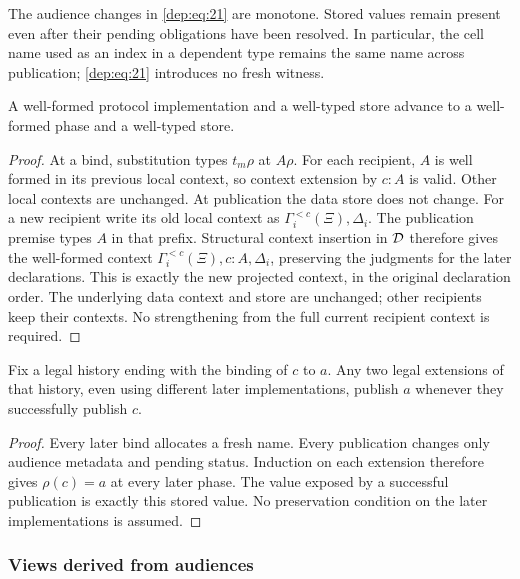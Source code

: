 The audience changes in \eqref{dep:eq:21} are monotone. Stored values remain present
even after their pending obligations have been resolved. In particular,
the cell name used as an index in a dependent type remains the same name
across publication; \eqref{dep:eq:21} introduces no fresh witness.

\begin{lemma}
\label{lem:phase-preservation}
A well-formed protocol implementation and a well-typed store advance to a
well-formed phase and a well-typed store.
\end{lemma}
\begin{proof}
At a bind, substitution types $t_m\rho$ at $A\rho$.
For each recipient, $A$ is well formed in its previous local context, so
context extension by $c:A$ is valid. Other local contexts are unchanged.
At publication the data store does not change. For a new recipient write
its old local context as $\Gamma_i^{<c}(\Xi),\Delta_i$.
The publication premise types $A$ in that prefix. Structural context
insertion in $\mathcal D$ therefore gives the well-formed context
$\Gamma_i^{<c}(\Xi),c:A,\Delta_i$, preserving the judgments for the
later declarations. This is exactly the new projected context, in the
original declaration order. The underlying data context and store are
unchanged; other recipients keep their contexts. No strengthening from
the full current recipient context is required.
\end{proof}

\begin{lemma}
\label{prop:binding}
Fix a legal history ending with the binding of $c$ to $a$. Any two legal
extensions of that history, even using different later implementations,
publish $a$ whenever they successfully publish $c$.
\end{lemma}
\begin{proof}
Every later bind allocates a fresh name. Every publication changes only
audience metadata and pending status. Induction on each extension therefore
gives $\rho(c)=a$ at every later phase. The value exposed by a successful
publication is exactly this stored value. No preservation condition on the
later implementations is assumed.
\end{proof}

\subsubsection{Views derived from audiences}

